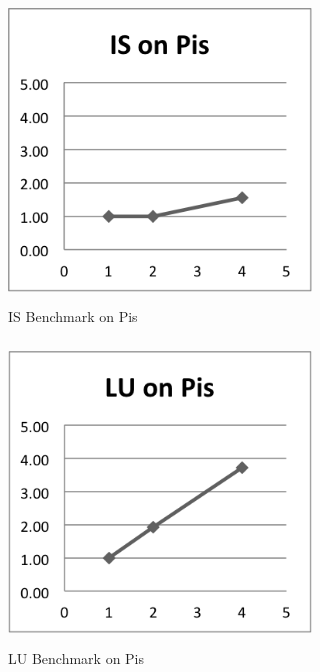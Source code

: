 \documentclass{acm_proc_article-sp}
\begin{document}
\begin{figure}[tbp]
  \centering
  \caption{IS Benchmark on Pis}
	\label{PiIS}
  \includegraphics[width=19pc, height=19pc]{Pics-Pi/IS.png}
\end{figure}

\begin{figure}[tbp]
  \centering
  \caption{LU Benchmark on Pis}
	\label{PiLU}
  \includegraphics[width=19pc, height=19pc]{Pics-Pi/LU.png}
\end{figure}
\end{document}
